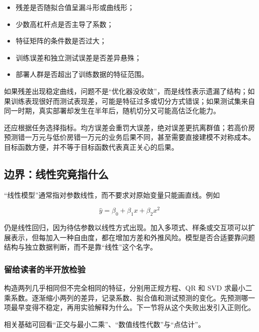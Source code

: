 \begin{itemize}
\tightlist
\item
  残差是否随拟合值呈漏斗形或曲线形；
\item
  少数高杠杆点是否主导了系数；
\item
  特征矩阵的条件数是否过大；
\item
  训练误差和独立测试误差是否差异悬殊；
\item
  部署人群是否超出了训练数据的特征范围。
\end{itemize}

如果残差出现稳定曲线，问题不是``优化器没收敛''，而是线性表示遗漏了结构；如果训练表现很好而测试表现差，可能是特征过多或切分方式错误；如果测试集来自同一时期，真实部署却发生在半年后，随机切分又可能高估泛化能力。

还应根据任务选择指标。均方误差会重罚大误差，绝对误差更抗离群值；若高价房预测错一万元与低价房错一万元的业务后果不同，甚至需要直接建模不对称成本。目标函数方便，并不等于目标函数代表真正关心的后果。

\subsection{边界：线性究竟指什么}

``线性模型''通常指对参数线性，而不要求对原始变量只能画直线。例如

\[
\widehat y=\beta_0+\beta_1x+\beta_2x^2
\]

仍是线性回归，因为待估参数以线性方式出现。加入多项式、样条或交互项可以扩展表示，但每加入一种自由度，都在增加方差和外推风险。模型是否合适要靠问题结构与独立数据判断，而不是靠``线性''这个名字。

\subsubsection{留给读者的半开放检验}

构造两列几乎相同但不完全相同的特征，分别用正规方程、QR 和 SVD 求最小二乘系数。逐渐缩小两列的差异，记录系数、拟合值和测试预测的变化。先预测哪一项最早变得不稳定，再用实验解释为什么。下一节将从这个失败出发引入正则化。

相关基础可回看``正交与最小二乘''、``数值线性代数''与``点估计''。
